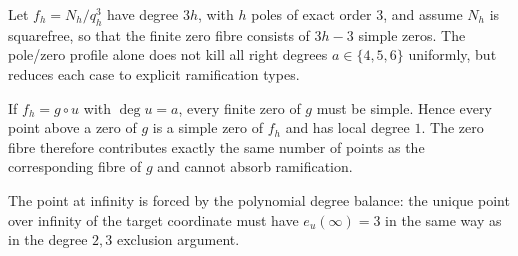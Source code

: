 \begin{theorem}
Let $f_h=N_h/q_h^3$ have degree $3h$, with $h$ poles of exact order $3$, and assume $N_h$ is squarefree, so that the finite zero fibre consists of $3h-3$ simple zeros. The pole/zero profile alone does not kill all right degrees $a\in\{4,5,6\}$ uniformly, but reduces each case to explicit ramification types.

If $f_h=g\circ u$ with $\deg u=a$, every finite zero of $g$ must be simple. Hence every point above a zero of $g$ is a simple zero of $f_h$ and has local degree $1$. The zero fibre therefore contributes exactly the same number of points as the corresponding fibre of $g$ and cannot absorb ramification.

The point at infinity is forced by the polynomial degree balance: the unique point over infinity of the target coordinate must have $e_u(\infty)=3$ in the same way as in the degree $2,3$ exclusion argument.
\end{theorem}


